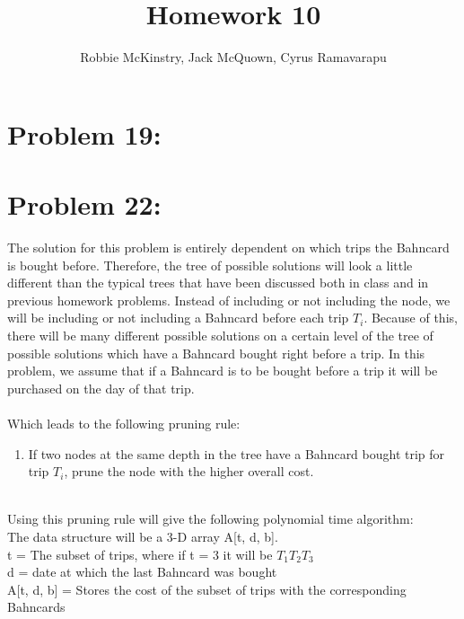\documentclass[12pt]{article}
\begin{document}
\title{Homework 10}
\author{Robbie McKinstry, Jack McQuown, Cyrus Ramavarapu}
\renewcommand{\today}{26 September 2016}
\renewcommand{\baselinestretch}{1.5}
\maketitle

\section*{Problem 19: }
\section*{Problem 22: }
The solution for this problem is entirely dependent on which trips the Bahncard is bought before.
Therefore, the tree of possible solutions will look a little different than the typical trees that
have been discussed both in class and in previous homework problems. Instead of including or not
including the node, we will be including or not including a Bahncard before each trip $T_i$.
Because of this, there will be many different possible solutions on a certain level of the tree
of possible solutions which have a Bahncard bought right before a trip. In this problem,
we assume that if a Bahncard is to be bought before a trip it will be purchased on the day of that trip.\\\\
Which leads to the following pruning rule:
\begin{enumerate}
\item If two nodes at the same depth in the tree have a Bahncard bought trip for  trip $T_i$, prune the node with the higher overall cost.\\\\
\end{enumerate}
Using this pruning rule will give the following polynomial time algorithm:\\
The data structure will be a 3-D array A[t, d, b].\\
t = The subset of trips, where if t = 3 it will be {$T_1T_2T_3$}\\
d = date at which the last Bahncard was bought\\
A[t, d, b] = Stores the cost of the subset of trips with the corresponding Bahncards\\
\end{document}
